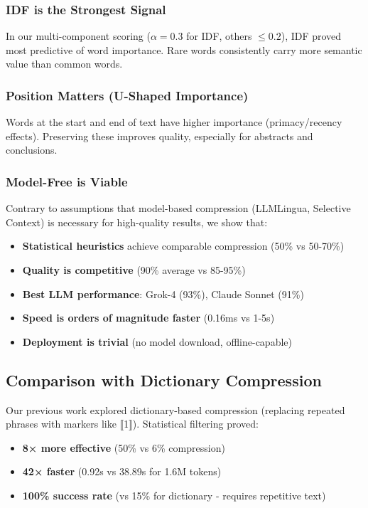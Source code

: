 \subsubsection{IDF is the Strongest Signal}

In our multi-component scoring ($\alpha = 0.3$ for IDF, others $\leq 0.2$), IDF proved most predictive of word importance. Rare words consistently carry more semantic value than common words.

\subsubsection{Position Matters (U-Shaped Importance)}

Words at the start and end of text have higher importance (primacy/recency effects). Preserving these improves quality, especially for abstracts and conclusions.

\subsubsection{Model-Free is Viable}

Contrary to assumptions that model-based compression (LLMLingua, Selective Context) is necessary for high-quality results, we show that:
\begin{itemize}
    \item \textbf{Statistical heuristics} achieve comparable compression (50\% vs 50-70\%)
    \item \textbf{Quality is competitive} (90\% average vs 85-95\%)
    \item \textbf{Best LLM performance}: Grok-4 (93\%), Claude Sonnet (91\%)
    \item \textbf{Speed is orders of magnitude faster} (0.16ms vs 1-5s)
    \item \textbf{Deployment is trivial} (no model download, offline-capable)
\end{itemize}

\subsection{Comparison with Dictionary Compression}

Our previous work explored dictionary-based compression (replacing repeated phrases with markers like ⟦1⟧). Statistical filtering proved:

\begin{itemize}
    \item \textbf{8× more effective} (50\% vs 6\% compression)
    \item \textbf{42× faster} (0.92s vs 38.89s for 1.6M tokens)
    \item \textbf{100\% success rate} (vs 15\% for dictionary - requires repetitive text)
\end{itemize}

